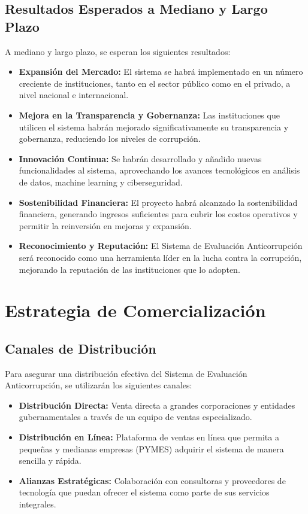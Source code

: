 \documentclass[a4paper,12pt]{article}
\begin{document}
\subsection{Resultados Esperados a Mediano y Largo Plazo}
A mediano y largo plazo, se esperan los siguientes resultados:

\begin{itemize}
    \item \textbf{Expansión del Mercado:} El sistema se habrá implementado en un número creciente de instituciones, tanto en el sector público como en el privado, a nivel nacional e internacional.
    \item \textbf{Mejora en la Transparencia y Gobernanza:} Las instituciones que utilicen el sistema habrán mejorado significativamente su transparencia y gobernanza, reduciendo los niveles de corrupción.
    \item \textbf{Innovación Continua:} Se habrán desarrollado y añadido nuevas funcionalidades al sistema, aprovechando los avances tecnológicos en análisis de datos, machine learning y ciberseguridad.
    \item \textbf{Sostenibilidad Financiera:} El proyecto habrá alcanzado la sostenibilidad financiera, generando ingresos suficientes para cubrir los costos operativos y permitir la reinversión en mejoras y expansión.
    \item \textbf{Reconocimiento y Reputación:} El Sistema de Evaluación Anticorrupción será reconocido como una herramienta líder en la lucha contra la corrupción, mejorando la reputación de las instituciones que lo adopten.
\end{itemize}

\section{Estrategia de Comercialización}
\subsection{Canales de Distribución}
Para asegurar una distribución efectiva del Sistema de Evaluación Anticorrupción, se utilizarán los siguientes canales:

\begin{itemize}
    \item \textbf{Distribución Directa:} Venta directa a grandes corporaciones y entidades gubernamentales a través de un equipo de ventas especializado.
    \item \textbf{Distribución en Línea:} Plataforma de ventas en línea que permita a pequeñas y medianas empresas (PYMES) adquirir el sistema de manera sencilla y rápida.
    \item \textbf{Alianzas Estratégicas:} Colaboración con consultoras y proveedores de tecnología que puedan ofrecer el sistema como parte de sus servicios integrales.
\end{itemize}
\end{document}
